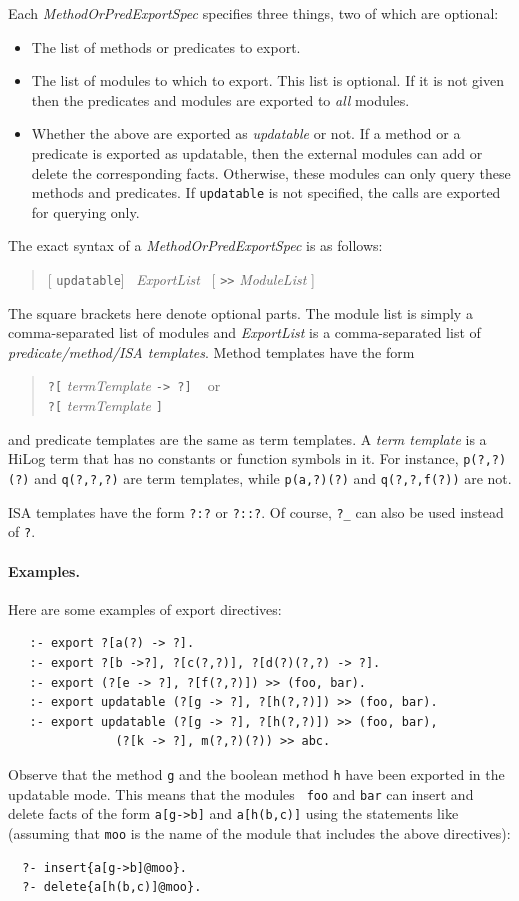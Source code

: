 \documentclass[11pt]{article}
\begin{document}
Each \emph{MethodOrPredExportSpec} specifies three things, two of which are
optional:
\begin{itemize}
  \item  The list of methods or predicates to export.
  \item  The list of modules to which to export.
     This list is optional. If it is not given then the predicates
     and modules are exported to \emph{all} modules.
   \item  Whether the above are exported as \emph{updatable} or not. 
     If a method or a predicate is exported as updatable, then the external
     modules can add or delete the corresponding facts. Otherwise, these
     modules can only query these methods and predicates.
     If {\tt updatable} is not specified, the calls are exported for
     querying only.
\end{itemize}
The exact syntax of a \emph{MethodOrPredExportSpec} is as follows:
\begin{quote}
    [ {\tt updatable}]~ \emph{ExportList}~ [ {\tt >>} \emph{ModuleList} ]
\end{quote}
The square brackets here denote optional parts. The module list is simply a
comma-separated list of modules and \emph{ExportList} is a comma-separated
list of \emph{predicate/method/ISA templates}. Method templates have the form
\begin{quote}
   {\tt ?[} \emph{termTemplate} {\tt -> ?]} ~ or\\
   {\tt ?[} \emph{termTemplate} {\tt]}\\
\end{quote}
and predicate templates are the same as term templates. A \emph{term
  template} is a HiLog term that has no constants or function symbols in
it. For instance, {\tt p(?,?)(?)} and {\tt q(?,?,?)} are term templates,
while {\tt p(a,?)(?)} and {\tt q(?,?,f(?))} are not.

ISA templates have the form  {\tt ?:?} or {\tt ?::?}.   Of course, {\tt ?\_}
can also be used instead of {\tt ?}.

\paragraph{Examples.}
Here are some examples of export directives:
\begin{verbatim}
   :- export ?[a(?) -> ?].
   :- export ?[b ->?], ?[c(?,?)], ?[d(?)(?,?) -> ?].
   :- export (?[e -> ?], ?[f(?,?)]) >> (foo, bar).
   :- export updatable (?[g -> ?], ?[h(?,?)]) >> (foo, bar).
   :- export updatable (?[g -> ?], ?[h(?,?)]) >> (foo, bar),
               (?[k -> ?], m(?,?)(?)) >> abc.
\end{verbatim}
Observe that the method {\tt g} and the boolean method {\tt h}
have been exported in the updatable mode. This means that the modules {\tt
  foo} and {\tt bar} can insert and delete facts of the form 
{\tt a[g->b]} and {\tt a[h(b,c)]} using the statements like
(assuming that {\tt moo} is the name of the module that includes the above
directives): 
\begin{verbatim}
  ?- insert{a[g->b]@moo}.
  ?- delete{a[h(b,c)]@moo}.
\end{verbatim}
\end{document}
